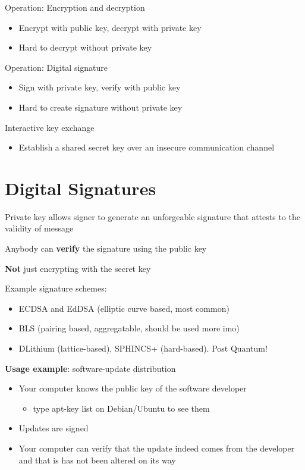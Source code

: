 \documentclass[11pt]{article}
\begin{document}
Operation: Encryption and decryption

\begin{itemize}
	\item Encrypt with public key, decrypt with private key
	\item Hard to decrypt without private key
\end{itemize}

Operation: Digital signature

\begin{itemize}
	\item Sign with private key, verify with public key
	\item Hard to create signature without private key
\end{itemize}

Interactive key exchange

\begin{itemize}
	\item Establish a shared secret key over an insecure communication channel
\end{itemize}

\section*{Digital Signatures}

Private key allows signer to generate an unforgeable signature that attests to the validity of message

Anybody can \textbf{verify} the signature using the public key

\textbf{Not} just encrypting with the secret key

Example signature schemes:
\begin{itemize}
	\item ECDSA and EdDSA (elliptic curve based, most common)
	\item BLS (pairing based, aggregatable, should be used more imo)
	\item DLithium (lattice-based), SPHINCS+ (hard-based). Post Quantum!
\end{itemize}

\textbf{Usage example}: software-update distribution

\begin{itemize}
	\item Your computer knows the public key of the software developer
	\begin{itemize}
		\item type apt-key list on Debian/Ubuntu to see them
	\end{itemize}
	\item Updates are signed
	\item Your computer can verify that the update indeed comes from the developer and that is has not been altered on its way
\end{itemize}
\end{document}
